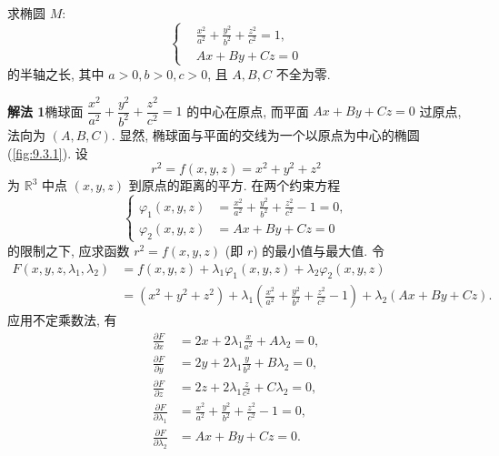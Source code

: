 \begin{example}\label{ex:9.3.3}
求椭圆 $M$:
\[
  \left\{\begin{aligned}
    &\frac{x^{2}}{a^{2}} + \frac{y^{2}}{b^{2}} + \frac{z^{2}}{c^{2}} = 1, \\
    &Ax + By + Cz = 0
  \end{aligned}\right.
\]
的半轴之长, 其中 $a > 0, b > 0, c > 0$, 且 $A, B, C$ 不全为零.
\end{example}

\begin{solution}
\textbf{解法 1}\quad 椭球面 $\dfrac{x^{2}}{a^{2}} + \dfrac{y^{2}}{b^{2}} + \dfrac{z^{2}}{c^{2}} = 1$ 的中心在原点, 而平面 $Ax + By + Cz = 0$ 过原点, 法向为 $(A, B, C)$. 显然, 椭球面与平面的交线为一个以原点为中心的椭圆(\cref{fig:9.3.1}). 设
\[
  r^{2} = f(x, y, z) = x^{2} + y^{2} + z^{2}
\]
为 $\mathbb{R}^{3}$ 中点 $(x, y, z)$ 到原点的距离的平方. 在两个约束方程
\[
  \left\{\begin{aligned}
    \varphi_{1}(x, y, z) &= \frac{x^{2}}{a^{2}} + \frac{y^{2}}{b^{2}} + \frac{z^{2}}{c^{2}} - 1 = 0, \\
    \varphi_{2}(x, y, z) &= Ax + By + Cz = 0
  \end{aligned}\right.
\]
的限制之下, 应求函数 $r^{2} = f(x, y, z)$ (即 $r$) 的最小值与最大值. 令
\begin{align*}
  F(x, y, z, \lambda_{1}, \lambda_{2}) &= f(x, y, z) + \lambda_{1} \varphi_{1}(x, y, z) + \lambda_{2} \varphi_{2}(x, y, z) \\
  &= (x^{2} + y^{2} + z^{2}) + \lambda_{1}\left(\frac{x^{2}}{a^{2}} + \frac{y^{2}}{b^{2}} + \frac{z^{2}}{c^{2}} - 1\right) + \lambda_{2}(Ax + By + Cz).
\end{align*}
应用不定乘数法, 有
\begin{align}
  \frac{\partial F}{\partial x} &= 2x + 2\lambda_{1}\frac{x}{a^{2}} + A\lambda_{2} = 0, \label{eq:9.3.3.1} \\
  \frac{\partial F}{\partial y} &= 2y + 2\lambda_{1}\frac{y}{b^{2}} + B\lambda_{2} = 0, \label{eq:9.3.3.2} \\
  \frac{\partial F}{\partial z} &= 2z + 2\lambda_{1}\frac{z}{c^{2}} + C\lambda_{2} = 0, \label{eq:9.3.3.3} \\
  \frac{\partial F}{\partial \lambda_{1}} &= \frac{x^{2}}{a^{2}} + \frac{y^{2}}{b^{2}} + \frac{z^{2}}{c^{2}} - 1 = 0, \label{eq:9.3.3.4} \\
  \frac{\partial F}{\partial \lambda_{2}} &= Ax + By + Cz = 0. \label{eq:9.3.3.5}
\end{align}


\end{solution}
